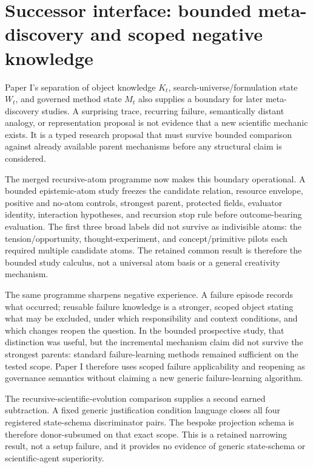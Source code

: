 \section{Successor interface: bounded meta-discovery and scoped negative knowledge}
\label{sec:p1-successor-discovery-failure}

Paper I's separation of object knowledge $K_t$, search-universe/formulation state $W_t$, and governed method state $M_t$ also supplies a boundary for later meta-discovery studies. A surprising trace, recurring failure, semantically distant analogy, or representation proposal is not evidence that a new scientific mechanic exists. It is a typed research proposal that must survive bounded comparison against already available parent mechanisms before any structural claim is considered.

The merged recursive-atom programme now makes this boundary operational. A bounded epistemic-atom study freezes the candidate relation, resource envelope, positive and no-atom controls, strongest parent, protected fields, evaluator identity, interaction hypotheses, and recursion stop rule before outcome-bearing evaluation. The first three broad labels did not survive as indivisible atoms: the tension/opportunity, thought-experiment, and concept/primitive pilots each required multiple candidate atoms. The retained common result is therefore the bounded study calculus, not a universal atom basis or a general creativity mechanism.

The same programme sharpens negative experience. A failure episode records what occurred; reusable failure knowledge is a stronger, scoped object stating what may be excluded, under which responsibility and context conditions, and which changes reopen the question. In the bounded prospective study, that distinction was useful, but the incremental mechanism claim did not survive the strongest parents: standard failure-learning methods remained sufficient on the tested scope. Paper I therefore uses scoped failure applicability and reopening as governance semantics without claiming a new generic failure-learning algorithm.

The recursive-scientific-evolution comparison supplies a second earned
subtraction. A fixed generic justification condition language closes all four
registered state-schema discriminator pairs. The bespoke projection schema is
therefore donor-subsumed on that exact scope. This is a retained narrowing
result, not a setup failure, and it provides no evidence of generic state-schema
or scientific-agent superiority.

